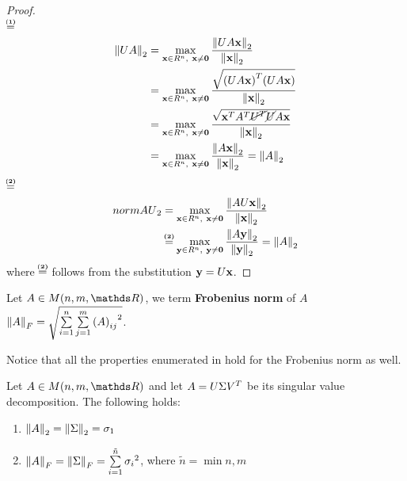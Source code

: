 \documentclass[computationalMathematics.tex]{subfiles}
\begin{document}
\begin{proof}~\\
	\hangindent=0.7cm$\numeq{(1)}$
	\[
		\begin{split}
			\left\lVert UA\right\rVert_2 &= \max\limits_{{\bf x } \in R^n,~{\bf x } \ne {\bf 0 }} \frac{\left\lVert UA{\bf x }\right\rVert_2}{\left\lVert{\bf x }\right\rVert_2}\\
			&= \max\limits_{{\bf x } \in R^n,~{\bf x } \ne {\bf 0 }} \frac{\sqrt{({UA{\bf x })}^{T}(U A {\bf x })}}{\left\lVert{\bf x }\right\rVert_2}\\
			&= \max\limits_{{\bf x } \in R^n,~{\bf x } \ne {\bf 0 }} \frac{\sqrt{{{\bf x }}^{T} {A}^{T} \cancel{{U}^{T}} \cancel{U} A {\bf x }}}{\left\lVert{\bf x }\right\rVert_2}\\
			&= \max\limits_{{\bf x } \in R^n,~{\bf x } \ne {\bf 0 }} \frac{\left\lVert A{\bf x }\right\rVert_2}{\left\lVert{\bf x }\right\rVert_2} = \left\lVert A\right\rVert_2
		\end{split}
	\]
	\hangindent=0.7cm$\numeq{(2)}$
	\[
	\begin{split}
		norm{AU}_2 &= \max\limits_{\vect{x} \in R^n,~\vect{x} \ne \vect{0}} \frac{\norm{AU\vect{x}}_2}{\norm{\vect{x}}_2}\\
		&\numeq{(2)} \max\limits_{\vect{y} \in R^n,~\vect{y} \ne \vect{0}} \frac{\norm{A\vect{y}}_2}{\norm{\vect{y}}_2} = \norm{A}_2
	\end{split}
	\]
	where $\numeq{(2)}$ follows from the substitution ${\bf y }=U{\bf x }$.
\end{proof}

\begin{definition}
  Let $A \in M(n, m, \R)$, we term \textbf{Frobenius norm} of $A$ ${\left\lVert A\right\rVert}_F = \sqrt{\sum\limits_{i=1}^n \sum\limits_{j=1}^m {{(A)}_{ij}}^2}$.
\end{definition}

Notice that all the properties enumerated in  hold for the Frobenius norm as well.

\begin{proposition}
  Let $A \in M(n, m, \R)$ and let $A = U \Sigma {V}^{T}$ be its singular value decomposition.
  The following holds:
  \begin{enumerate}
    \item $\left\lVert A\right\rVert_2 = \left\lVert\Sigma\right\rVert_2 = \sigma_1$
    \item $\left\lVert A\right\rVert_F = \left\lVert\Sigma\right\rVert_F = \sum\limits_{i=1}^{\tilde{n}} {\sigma_i}^2$, where $\tilde{n} = \min{n, m}$
  \end{enumerate}
\end{proposition}
\end{document}
